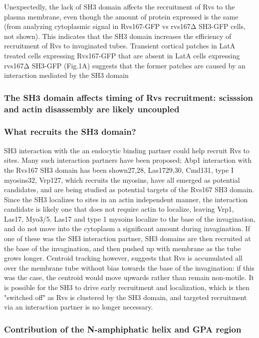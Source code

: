 Unexpectedly, the lack of SH3 domain affects the recruitment of Rvs to the plasma membrane, even though the amount of protein expressed is the same (from analyzing cytoplasmic signal in Rvs167-GFP vs rvs167Δ SH3-GFP cells, not shown). This indicates that the SH3 domain increases the efficiency of recruitment of Rvs to invaginated tubes. Transient cortical patches in LatA treated cells expressing Rvs167-GFP that are absent in LatA cells expressing rvs167Δ SH3-GFP (Fig.1A) suggests that the former patches are caused by an interaction mediated by the SH3 domain

\subsubsection{The SH3 domain affects timing of Rvs recruitment: scisssion and actin disassembly are likely uncoupled}


\subsubsection{What recruits the SH3 domain?}
SH3 interaction with the an endocytic binding partner could help recruit Rvs to sites. Many such interaction partners have been proposed; Abp1 interaction with the Rvs167 SH3 domain has been shown27,28, Las1729,30, Cmd131, type I myosins32, Vrp127, which recruits the myosins, have all emerged as potential candidates, and are being studied as potential targets of the Rvs167 SH3 domain. Since the SH3 localizes to sites in an actin independent manner, the interaction candidate is likely one that does not require actin to localize, leaving Vrp1, Las17, Myo3/5. Las17 and type 1 mysoins localize to the base of the invagination, and do not move into the cytoplasm a significant amount during invagination. If one of these was the SH3 interaction partner, SH3 domains are then recruited at the base of the invagination, and then pushed up with membrane as the tube grows longer. Centroid tracking however, suggests that Rvs is accumulated all over the membrane tube without bias towards the base of the invagination: if this was the case, the centroid would move upwards rather than remain non-motile. It is possible for the SH3 to drive early recruitment and localization, which is then "switched off" as Rvs is clustered by the SH3 domain, and targeted recruitment via an interaction partner is no longer necessary. 

\subsubsection{Contribution of the N-amphiphatic helix and GPA region}


